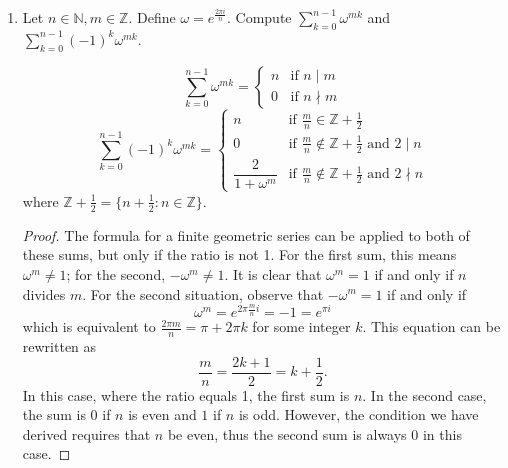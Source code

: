 \documentclass[10pt]{article}
\newcommand{\N}{\mathbb{N}}
\newcommand{\Z}{\mathbb{Z}}
\begin{document}
\begin{enumerate}
\item Let $n \in \N, m \in \Z$.  Define $\omega = e^{\frac{2\pi i}{n}}$.  Compute $\sum\limits_{k=0}^{n-1} \omega^{mk}$ and $\sum\limits_{k=0}^{n-1} (-1)^k \omega^{mk}$.

$$
\sum\limits_{k=0}^{n-1} \omega^{mk} =
\begin{cases}
n & \text{if } n \mid m \\
0 & \text{if } n \nmid m
\end{cases}
$$
$$
\sum\limits_{k=0}^{n-1} (-1)^k \omega^{mk} =
\begin{cases}
n & \text{if } \frac{m}{n} \in \Z + \frac12 \\
0 & \text{if } \frac{m}{n} \not \in \Z + \frac12 \text{ and }2 \mid n \\
\dfrac{2}{1 + \omega^m} & \text{if } \frac{m}{n} \not \in \Z + \frac12 \text{ and } 2 \nmid n
\end{cases}
$$
where $\Z + \frac12 = \{n + \frac12 : n \in \Z \}$.

\begin{proof}

The formula for a finite geometric series can be applied to both of these sums, but only if the ratio is not 1.  For the first sum, this means $\omega^m \neq 1$; for the second, $-\omega^m \neq 1$.  It is clear that $\omega^m = 1$ if and only if $n$ divides $m$.  For the second situation, observe that $-\omega^m = 1$ if and only if
$$
\omega^m = e^{2\pi\frac{m}{n}i} = -1 = e^{\pi i}
$$
which is equivalent to $\frac{2\pi m}{n} = \pi + 2\pi k$ for some integer $k$.  This equation can be rewritten as
$$
\frac{m}{n} = \frac{2k+1}{2} = k + \frac12.
$$
In this case, where the ratio equals 1, the first sum is $n$.  In the second case, the sum is 0 if $n$ is even and $1$ if $n$ is odd.  However, the condition we have derived requires that $n$ be even, thus the second sum is always $0$ in this case.


\end{proof}
\end{enumerate}
\end{document}
